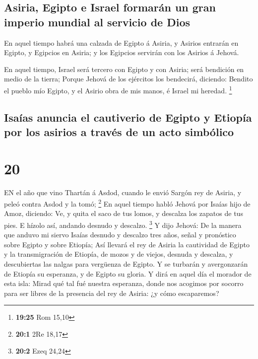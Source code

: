 \hypertarget{asiria-egipto-e-israel-formaruxe1n-un-gran-imperio-mundial-al-servicio-de-dios}{%
\subsection{Asiria, Egipto e Israel formarán un gran imperio mundial al
servicio de
Dios}\label{asiria-egipto-e-israel-formaruxe1n-un-gran-imperio-mundial-al-servicio-de-dios}}

 En aquel tiempo habrá una calzada de Egipto á Asiria, y
Asirios entrarán en Egipto, y Egipcios en Asiria; y los Egipcios
servirán con los Asirios á Jehová.

 En aquel tiempo, Israel será tercero con Egipto y con
Asiria; será bendición en medio de la tierra;  Porque
Jehová de los ejércitos los bendecirá, diciendo: Bendito el pueblo mío
Egipto, y el Asirio obra de mis manos, é Israel mi heredad. \footnote{\textbf{19:25}
  Rom 15,10}

\hypertarget{isauxedas-anuncia-el-cautiverio-de-egipto-y-etiopuxeda-por-los-asirios-a-travuxe9s-de-un-acto-simbuxf3lico}{%
\subsection{Isaías anuncia el cautiverio de Egipto y Etiopía por los
asirios a través de un acto
simbólico}\label{isauxedas-anuncia-el-cautiverio-de-egipto-y-etiopuxeda-por-los-asirios-a-travuxe9s-de-un-acto-simbuxf3lico}}

\hypertarget{section-19}{%
\section{20}\label{section-19}}

 EN el año que vino Thartán á Asdod, cuando le envió Sargón
rey de Asiria, y peleó contra Asdod y la tomó; \footnote{\textbf{20:1}
  2Re 18,17}  En aquel tiempo habló Jehová por Isaías hijo
de Amoz, diciendo: Ve, y quita el saco de tus lomos, y descalza los
zapatos de tus pies. E hízolo así, andando desnudo y descalzo.
\footnote{\textbf{20:2} Ezeq 24,24}  Y dijo Jehová: De la
manera que anduvo mi siervo Isaías desnudo y descalzo tres años, señal y
pronóstico sobre Egipto y sobre Etiopía;  Así llevará el rey
de Asiria la cautividad de Egipto y la transmigración de Etiopía, de
mozos y de viejos, desnuda y descalza, y descubiertas las nalgas para
vergüenza de Egipto.  Y se turbarán y avergonzarán de
Etiopía su esperanza, y de Egipto su gloria.  Y dirá en
aquel día el morador de esta isla: Mirad qué tal fué nuestra esperanza,
donde nos acogimos por socorro para ser libres de la presencia del rey
de Asiria: ¿y cómo escaparemos?

